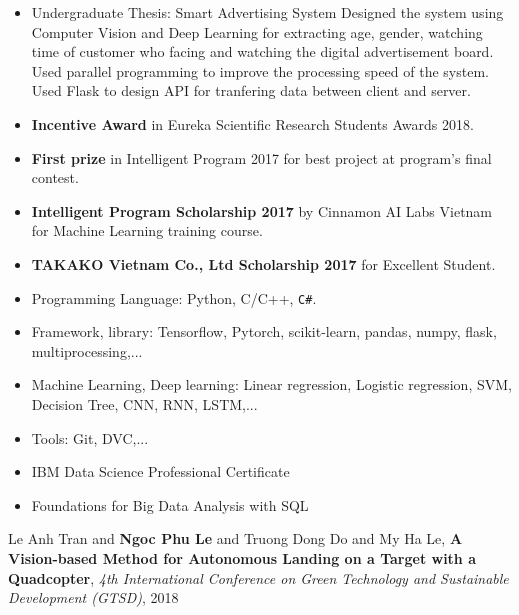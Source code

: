 %
\bigskip
\bigskip
\begin{itemize}
\item Undergraduate Thesis: Smart Advertising System 
\newline
Designed the system using Computer Vision and Deep Learning for extracting age, gender, watching time of customer who facing and watching the digital advertisement board.
\newline 
Used parallel programming to improve the processing speed of the system.
\newline
Used Flask to design API for tranfering data between client and server.
\end{itemize}

\smallskip
\begin{itemize}

\item \textbf{Incentive Award} in Eureka Scientific Research Students Awards 2018.
\smallskip

\item \textbf{First prize} in Intelligent Program 2017 for best project at program's final contest.
\smallskip
\item \textbf{Intelligent Program Scholarship 2017} by Cinnamon AI Labs Vietnam for Machine Learning training course.
\smallskip
\item \textbf{TAKAKO Vietnam Co., Ltd Scholarship 2017} for Excellent Student.
\end{itemize}

\smallskip
\begin{itemize}
\item Programming Language: Python, C/C++, \texttt{C\#}.
\smallskip
\item Framework, library: Tensorflow, Pytorch, scikit-learn, pandas, numpy, flask, multiprocessing,...
\smallskip
\item Machine Learning, Deep learning: Linear regression, Logistic regression, SVM, Decision Tree, CNN, RNN, LSTM,...
\item Tools: Git, DVC,...
\end{itemize}

\smallskip
\begin{itemize}
\item IBM Data Science Professional Certificate
\smallskip
\item Foundations for Big Data Analysis with SQL
\end{itemize}



Le Anh Tran and \textbf{Ngoc Phu Le} and Truong Dong Do and My Ha Le, \textbf{A Vision-based Method for Autonomous Landing on a Target with a Quadcopter}, \textit{4th International Conference on Green Technology and Sustainable Development (GTSD)}, 2018




